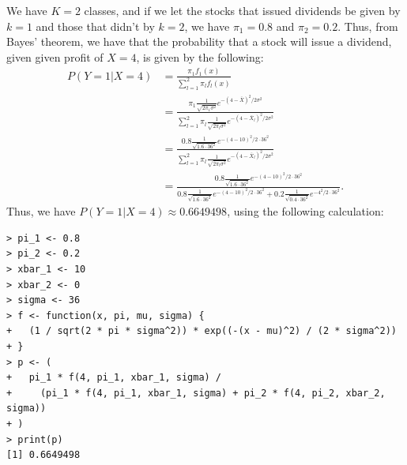 We have $K = 2$ classes, and if we let the stocks that issued dividends be
given by $k = 1$ and those that didn't by $k = 2$, we have $\pi_1 = 0.8$ and
$\pi_2 = 0.2$. Thus, from Bayes' theorem, we have that the probability that a
stock will issue a dividend, given given profit of $X = 4$, is given by the
following:
\begin{equation*}
    \begin{split}
        P(Y = 1 \vert X = 4) &= \frac{\pi_1 f_1(x)}{\sum_{l=1}^2 \pi_l f_l(x)} \\
        &= \frac{\pi_1 \frac{1}{\sqrt{2 \pi_1 \sigma^2}}e^{-{(4 - \bar{X})}^2 / 2\sigma^2}}
        {\sum_{l=1}^2 \pi_l \frac{1}{\sqrt{2 \pi_l \sigma^2}}
        e^{-{(4 - \bar{X}_l)}^2 / 2\sigma^2}} \\
        &= \frac{0.8 \frac{1}{\sqrt{1.6 \cdot 36^2}}e^{-{(4 - 10)}^2 / 2 \cdot 36^2}}
        {\sum_{l=1}^2 \pi_l \frac{1}{\sqrt{2 \pi_l \sigma^2}}
        e^{-{(4 - \bar{X}_l)}^2 / 2\sigma^2}} \\
        &= \frac{0.8 \frac{1}{\sqrt{1.6 \cdot 36^2}}e^{-{(4 - 10)}^2 / 2 \cdot 36^2}}
        {0.8 \frac{1}{\sqrt{1.6 \cdot 36^2}}e^{-{(4 - 10)}^2 / 2 \cdot 36^2}
        + 0.2 \frac{1}{\sqrt{0.4 \cdot 36^2}}e^{-{4^2 / 2 \cdot 36^2}}}.
    \end{split}
\end{equation*}
Thus, we have $P(Y = 1 \vert X = 4) \approx 0.6649498$, using the following
calculation:
\begin{lstlisting}
> pi_1 <- 0.8
> pi_2 <- 0.2
> xbar_1 <- 10
> xbar_2 <- 0
> sigma <- 36
> f <- function(x, pi, mu, sigma) {
+   (1 / sqrt(2 * pi * sigma^2)) * exp((-(x - mu)^2) / (2 * sigma^2))
+ }
> p <- (
+   pi_1 * f(4, pi_1, xbar_1, sigma) /
+     (pi_1 * f(4, pi_1, xbar_1, sigma) + pi_2 * f(4, pi_2, xbar_2, sigma))
+ )
> print(p)
[1] 0.6649498
\end{lstlisting}
